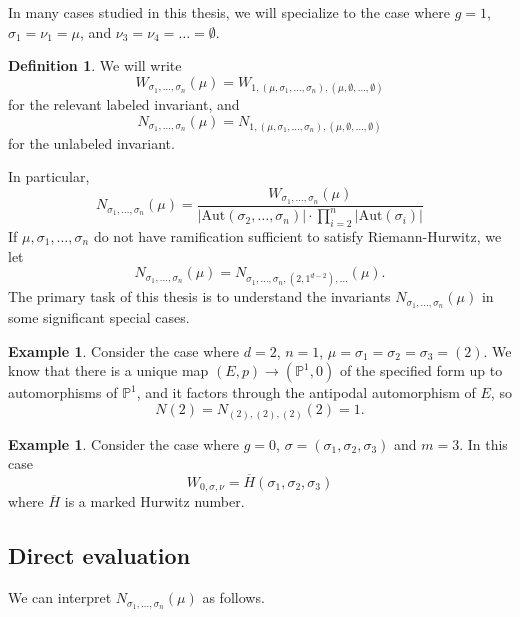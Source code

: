 \documentclass[11pt]{article}           %
\newcommand{\Aut}{\text{Aut}}
\renewcommand{\P}{\mathbb P}
\theoremstyle{definition}
\newtheorem{dfn}[thm]{Definition}
\newtheorem{eg}[thm]{Example}
\begin{document}
In many cases studied in this thesis, we will specialize to the case where $g=1$,
$\sigma_1=\nu_1=\mu$, and $\nu_3=\nu_4=\dots=\emptyset$.
\begin{dfn}
  We will write
\[
W_{\sigma_1,\dots,\sigma_n}(\mu)=W_{1,(\mu,\sigma_1,\dots,\sigma_n),(\mu,\emptyset,\dots,\emptyset)}
\]
for the relevant labeled invariant, and
\[
N_{\sigma_1,\dots,\sigma_n}(\mu)=N_{1,(\mu,\sigma_1,\dots,\sigma_n),(\mu,\emptyset,\dots,\emptyset)}
\]
for the unlabeled invariant.\end{dfn}
In particular,
\[
N_{\sigma_1,\dots,\sigma_n}(\mu)=\frac{W_{\sigma_1,\dots,\sigma_n}(\mu)}{|\Aut(\sigma_2,\dots,\sigma_n)|\cdot\prod_{i=2}^n|\Aut(\sigma_i)|}
\]
If $\mu,\sigma_1,\dots,\sigma_n$ do not have ramification sufficient to satisfy Riemann-Hurwitz,
we let \[N_{\sigma_1,\dots,\sigma_n}(\mu) = N_{\sigma_1,\dots,\sigma_n,(2,1^{d-2}),\dots}(\mu).\]
The primary task of this thesis is to understand the invariants $N_{\sigma_1,\dots,\sigma_n}(\mu)$
in some significant special cases.

\begin{eg}
  Consider the case where $d=2$, $n=1$, $\mu=\sigma_1=\sigma_2=\sigma_3=(2)$.
  We know that there is a unique map $(E,p)\to (\mathbb P^1,0)$ of the specified form
  up to automorphisms of $\P^1$, and it factors through the antipodal automorphism of $E$,
  so
  \[
  N(2)=N_{(2),(2),(2)}(2)=1.
  \]
\end{eg}

\begin{eg}
  Consider the case where $g=0$, $\sigma=(\sigma_1,\sigma_2,\sigma_3)$ and $m=3$. In this case
  \[
  W_{0,\sigma,\nu}=\overline H(\sigma_1,\sigma_2,\sigma_3)
  \]
  where $\overline H$ is a marked Hurwitz number.
  \end{eg}

\subsection{Direct evaluation}
\label{section:direct1}
We can interpret $N_{\sigma_1,\dots,\sigma_n}(\mu)$ as follows.
\end{document}
